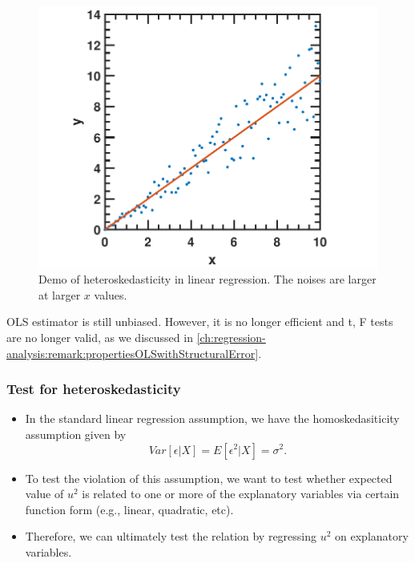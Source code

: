 \begin{refsection}
\begin{figure}[H]
	\centering
	\includegraphics[width=0.6\linewidth]{../figures/statisticalModeling/estimationTheory/heteroscedasiticityDemo}
	\caption{Demo of heteroskedasticity in linear regression. The noises are larger at larger $x$ values.}
	\label{fig:heteroscedasiticitydemo}
\end{figure}



\begin{remark}
	
\end{remark}


\begin{remark}
OLS estimator is still unbiased. However, it is no longer efficient and t, F tests are no longer valid, as we discussed in \autoref{ch:regression-analysis:remark:propertiesOLSwithStructuralError}.
\end{remark}




\subsubsection{Test for heteroskedasticity}
\begin{remark}\hfill
\begin{itemize}
	\item 	In the standard linear regression assumption, we have the homoskedasiticity assumption given by	
	$$Var[\epsilon|X] = E[\epsilon^2|X]= \sigma^2.$$
	\item To test the violation of this assumption, we want to test whether expected value of $u^2$ is related to one or more of the explanatory variables via certain function form (e.g., linear, quadratic, etc). 
	\item Therefore, we can ultimately test the relation by regressing $u^2$ on explanatory variables. 
\end{itemize}	
\end{remark}






\end{refsection}
